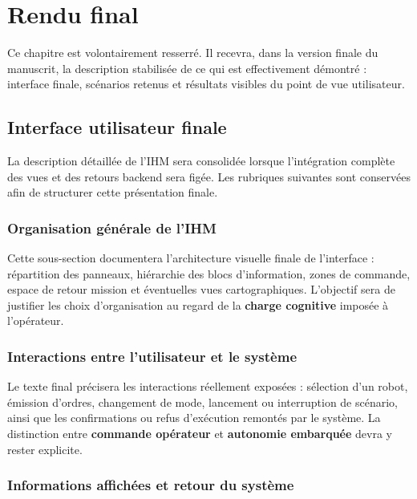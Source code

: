 \documentclass[11pt,a4paper]{report}
\newcommand{\kw}[1]{\textbf{#1}}
\begin{document}
\fi

\chapter{Rendu final}

Ce chapitre est volontairement resserré. Il recevra, dans la version finale du manuscrit, la description stabilisée de ce qui est effectivement démontré : interface finale, scénarios retenus et résultats visibles du point de vue utilisateur.

\section{Interface utilisateur finale}

La description détaillée de l’IHM sera consolidée lorsque l’intégration complète des vues et des retours backend sera figée. Les rubriques suivantes sont conservées afin de structurer cette présentation finale.

\subsection{Organisation générale de l’IHM}

Cette sous-section documentera l’architecture visuelle finale de l’interface : répartition des panneaux, hiérarchie des blocs d’information, zones de commande, espace de retour mission et éventuelles vues cartographiques. L’objectif sera de justifier les choix d’organisation au regard de la \kw{charge cognitive} imposée à l’opérateur.

\subsection{Interactions entre l’utilisateur et le système}

Le texte final précisera les interactions réellement exposées : sélection d’un robot, émission d’ordres, changement de mode, lancement ou interruption de scénario, ainsi que les confirmations ou refus d’exécution remontés par le système. La distinction entre \kw{commande opérateur} et \kw{autonomie embarquée} devra y rester explicite.

\subsection{Informations affichées et retour du système}
\end{document}

